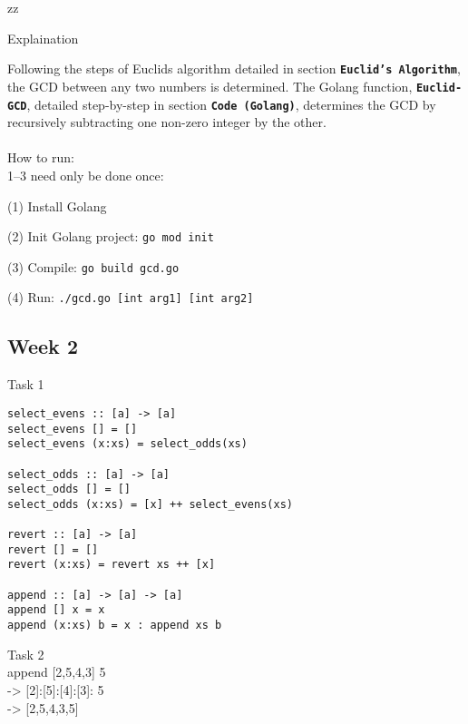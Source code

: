 zz\documentclass{article}
\theoremstyle{theorem}
\theoremstyle{definition}
\theoremstyle{remark}
\begin{document}
{\large Explaination\\}

Following the steps of Euclids algorithm detailed in section \texttt{{\bf Euclid's Algorithm}}, the GCD between any two numbers is determined. The Golang function, \texttt{{\bf Euclid-GCD}}, detailed step-by-step in section \texttt{{\bf Code (Golang)}}, determines the GCD by recursively subtracting one non-zero integer by the other.\\\\

{\large How to run:\\}
1--3 need only be done once:

(1) Install Golang

(2) Init Golang project: \texttt{go mod init} 

(3) Compile: \texttt{go build gcd.go} 

(4) Run: \texttt{./gcd.go [int arg1] [int arg2]} 

\subsection{Week 2}
{\large Task 1\\}
\begin{lstlisting}
select_evens :: [a] -> [a]
select_evens [] = []
select_evens (x:xs) = select_odds(xs)

select_odds :: [a] -> [a]
select_odds [] = []
select_odds (x:xs) = [x] ++ select_evens(xs)

revert :: [a] -> [a]  
revert [] = []  
revert (x:xs) = revert xs ++ [x]  

append :: [a] -> [a] -> [a]
append [] x = x
append (x:xs) b = x : append xs b
\end{lstlisting}

{\large Task 2\\}
append [2,5,4,3] 5 \\
-{\textgreater} [2]:[5]:[4]:[3]: 5 \\
-{\textgreater} [2,5,4,3,5]
\end{document}
